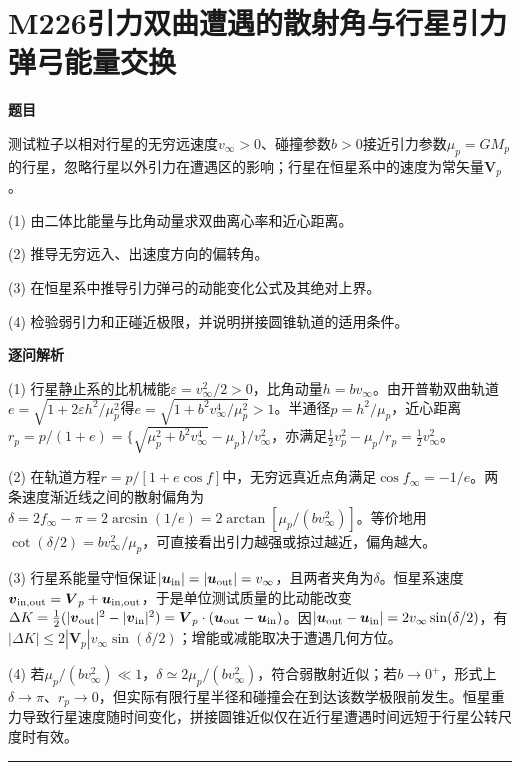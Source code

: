 \documentclass[UTF8,a4paper,11pt,oneside,openany]{ctexbook}
\begin{document}
\section*{M226\quad 引力双曲遭遇的散射角与行星引力弹弓能量交换}
\textbf{题目}\par
测试粒子以相对行星的无穷远速度$v_\infty>0$、碰撞参数$b>0$接近引力参数$\mu_p=GM_p$的行星，忽略行星以外引力在遭遇区的影响；行星在恒星系中的速度为常矢量$\boldsymbol V_p$。
\par\smallskip\noindent (1) 由二体比能量与比角动量求双曲离心率和近心距离。
\par\smallskip\noindent (2) 推导无穷远入、出速度方向的偏转角。
\par\smallskip\noindent (3) 在恒星系中推导引力弹弓的动能变化公式及其绝对上界。
\par\smallskip\noindent (4) 检验弱引力和正碰近极限，并说明拼接圆锥轨道的适用条件。
\par\medskip\textbf{逐问解析}\par
\par\smallskip\noindent (1) 行星静止系的比机械能$\varepsilon=v_\infty^2/2>0$，比角动量$h=bv_\infty$。由开普勒双曲轨道$e=\sqrt{1+2\varepsilon h^2/\mu_p^2}$得$e=\sqrt{1+b^2v_\infty^4/\mu_p^2}>1$。半通径$p=h^2/\mu_p$，近心距离$r_p=p/(1+e)=\{\sqrt{\mu_p^2+b^2v_\infty^4}-\mu_p\}/v_\infty^2$，亦满足$\frac12v_p^2-\mu_p/r_p=\frac12v_\infty^2$。
\par\smallskip\noindent (2) 在轨道方程$r=p/[1+e\cos f]$中，无穷远真近点角满足$\cos f_\infty=-1/e$。两条速度渐近线之间的散射偏角为$\delta=2f_\infty-\pi=2\arcsin(1/e)=2\arctan[\mu_p/(bv_\infty^2)]$。等价地用$\cot(\delta/2)=bv_\infty^2/\mu_p$，可直接看出引力越强或掠过越近，偏角越大。
\par\smallskip\noindent (3) 行星系能量守恒保证$|\boldsymbol u_{\rm in}|=|\boldsymbol u_{\rm out}|=v_\infty$，且两者夹角为$\delta$。恒星系速度$\boldsymbol v_{\rm in,out}=\boldsymbol V_p+\boldsymbol u_{\rm in,out}$，于是单位测试质量的比动能改变$\Delta K=\frac12(|\boldsymbol v_{\rm out}|^2-|\boldsymbol v_{\rm in}|^2)=\boldsymbol V_p\cdot(\boldsymbol u_{\rm out}-\boldsymbol u_{\rm in})$。因$|\boldsymbol u_{\rm out}-\boldsymbol u_{\rm in}|=2v_\infty\sin(\delta/2)$，有$|\Delta K|\le2|\boldsymbol V_p|v_\infty\sin(\delta/2)$；增能或减能取决于遭遇几何方位。
\par\smallskip\noindent (4) 若$\mu_p/(bv_\infty^2)\ll1$，$\delta\simeq2\mu_p/(bv_\infty^2)$，符合弱散射近似；若$b\to0^+$，形式上$\delta\to\pi$、$r_p\to0$，但实际有限行星半径和碰撞会在到达该数学极限前发生。恒星重力导致行星速度随时间变化，拼接圆锥近似仅在近行星遭遇时间远短于行星公转尺度时有效。
\par\medskip\hrule\medskip
\end{document}
